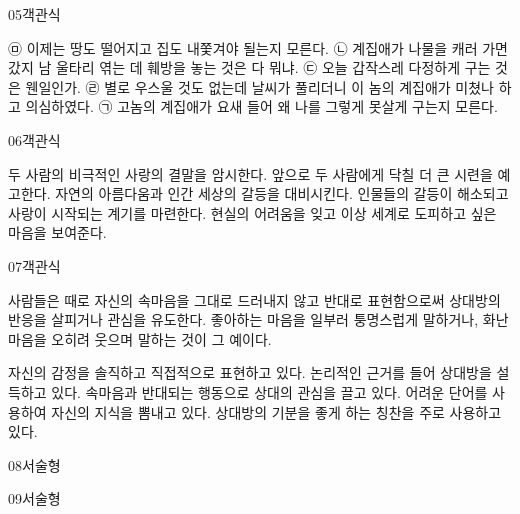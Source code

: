 \documentclass[fs9,seriesRus]{korfarm-base}
\begin{document}
\begin{kfQBlock}{05}{객관식}
\begin{kfChoices}
\kfChoice ㉤ 이제는 땅도 떨어지고 집도 내쫓겨야 될는지 모른다.
\kfChoice ㉡ 계집애가 나물을 캐러 가면 갔지 남 울타리 엮는 데 훼방을 놓는 것은 다 뭐냐.
\kfChoice ㉢ 오늘 갑작스레 다정하게 구는 것은 웬일인가.
\kfChoice ㉣ 별로 우스울 것도 없는데 날씨가 풀리더니 이 놈의 계집애가 미쳤나 하고 의심하였다.
\kfChoice ㉠ 고놈의 계집애가 요새 들어 왜 나를 그렇게 못살게 구는지 모른다.
\end{kfChoices}
\end{kfQBlock}
\begin{kfQBlock}{06}{객관식}
\begin{kfChoices}
\kfChoice 두 사람의 비극적인 사랑의 결말을 암시한다.
\kfChoice 앞으로 두 사람에게 닥칠 더 큰 시련을 예고한다.
\kfChoice 자연의 아름다움과 인간 세상의 갈등을 대비시킨다.
\kfChoice 인물들의 갈등이 해소되고 사랑이 시작되는 계기를 마련한다.
\kfChoice 현실의 어려움을 잊고 이상 세계로 도피하고 싶은 마음을 보여준다.
\end{kfChoices}
\end{kfQBlock}
\begin{kfQBlock}{07}{객관식}
\begin{kfEvidence}사람들은 때로 자신의 속마음을 그대로 드러내지 않고 반대로 표현함으로써 상대방의 반응을 살피거나 관심을 유도한다. 좋아하는 마음을 일부러 퉁명스럽게 말하거나, 화난 마음을 오히려 웃으며 말하는 것이 그 예이다.\end{kfEvidence}
\begin{kfChoices}
\kfChoice 자신의 감정을 솔직하고 직접적으로 표현하고 있다.
\kfChoice 논리적인 근거를 들어 상대방을 설득하고 있다.
\kfChoice 속마음과 반대되는 행동으로 상대의 관심을 끌고 있다.
\kfChoice 어려운 단어를 사용하여 자신의 지식을 뽐내고 있다.
\kfChoice 상대방의 기분을 좋게 하는 칭찬을 주로 사용하고 있다.
\end{kfChoices}
\end{kfQBlock}
\begin{kfQBlock}{08}{서술형}
\end{kfQBlock}
\begin{kfQBlock}{09}{서술형}
\end{kfQBlock}
\kfEndMC
\end{document}
